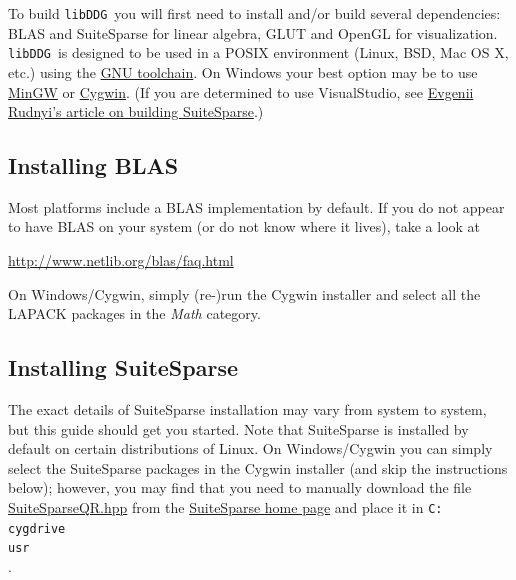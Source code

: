 \documentclass{article}
\newcommand{\libddg}{\texttt{libDDG}\ }
\begin{document}
To build \libddg you will first need to install and/or build several dependencies: BLAS and SuiteSparse for linear algebra, GLUT and OpenGL for visualization.  \libddg is designed to be used in a POSIX environment (Linux, BSD, Mac OS X, etc.) using the \href{http://en.wikipedia.org/wiki/GNU_toolchain}{GNU toolchain}.  On Windows your best option may be to use \href{http://www.mingw.org/}{MinGW} or \href{http://www.cygwin.com/}{Cygwin}.  (If you are determined to use VisualStudio, see \href{http://matrixprogramming.com/2008/05/umfpack-vc}{Evgenii Rudnyi's article on building SuiteSparse}.)

\subsection{Installing BLAS}

Most platforms include a BLAS implementation by default.  If you do not appear to have BLAS on your system (or do not know where it lives), take a look at

\url{http://www.netlib.org/blas/faq.html}

On Windows/Cygwin, simply (re-)run the Cygwin installer and select all the LAPACK packages in the \textit{Math} category.

\subsection{Installing SuiteSparse}

The exact details of SuiteSparse installation may vary from system to system, but this guide should get you started.  Note that SuiteSparse is installed by default on certain distributions of Linux.  On Windows/Cygwin you can simply select the SuiteSparse packages in the Cygwin installer (and skip the instructions below); however, you may find that you need to manually download the file \href{http://www.cise.ufl.edu/research/sparse/SPQR/SPQR/Include/SuiteSparseQR.hpp}{SuiteSparseQR.hpp} from the \href{http://www.cise.ufl.edu/research/sparse/SPQR/SPQR/}{SuiteSparse home page} and place it in \texttt{C:\\cygdrive\\usr\\\suitesparse}.
\end{document}
